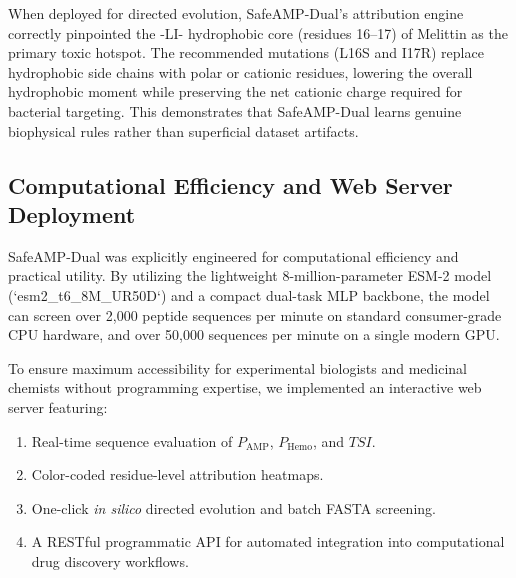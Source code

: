 \documentclass[11pt,a4paper]{article}
\begin{document}
When deployed for directed evolution, SafeAMP-Dual's attribution engine correctly pinpointed the -LI- hydrophobic core (residues 16--17) of Melittin as the primary toxic hotspot. The recommended mutations (L16S and I17R) replace hydrophobic side chains with polar or cationic residues, lowering the overall hydrophobic moment while preserving the net cationic charge required for bacterial targeting. This demonstrates that SafeAMP-Dual learns genuine biophysical rules rather than superficial dataset artifacts.

\subsection{Computational Efficiency and Web Server Deployment}
SafeAMP-Dual was explicitly engineered for computational efficiency and practical utility. By utilizing the lightweight 8-million-parameter ESM-2 model (`esm2\_t6\_8M\_UR50D`) and a compact dual-task MLP backbone, the model can screen over 2,000 peptide sequences per minute on standard consumer-grade CPU hardware, and over 50,000 sequences per minute on a single modern GPU. 

To ensure maximum accessibility for experimental biologists and medicinal chemists without programming expertise, we implemented an interactive web server featuring:
\begin{enumerate}
    \item Real-time sequence evaluation of $P_{\text{AMP}}$, $P_{\text{Hemo}}$, and $TSI$.
    \item Color-coded residue-level attribution heatmaps.
    \item One-click \textit{in silico} directed evolution and batch FASTA screening.
    \item A RESTful programmatic API for automated integration into computational drug discovery workflows.
\end{enumerate}
\end{document}
